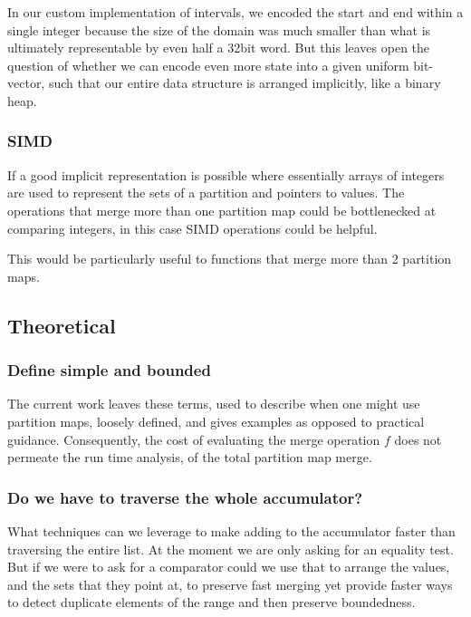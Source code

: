 \documentclass{article}
\begin{document}
In our custom implementation of intervals, we encoded the start and end
within a single integer because the size of the domain was much smaller
than what is ultimately representable by even half a 32bit word.
But this leaves open the question of whether we can encode even more state
into a given uniform bit-vector,
such that our entire data structure is arranged implicitly,
like a binary heap.

\subsubsection{SIMD}

If a good implicit representation is possible where essentially arrays of
integers are used to represent the sets of a partition and pointers to values.
The operations that merge more than one partition map could be bottlenecked
at comparing integers,
in this case SIMD operations could be helpful.

This would be particularly useful to functions that merge more than 2
partition maps.

\subsection{Theoretical}

\subsubsection{Define simple and bounded}

The current work leaves these terms,
used to describe when one might use partition maps,
loosely defined,
and gives examples as opposed to practical guidance.
Consequently,
the cost of evaluating the merge operation $f$ does not permeate
the run time analysis,
of the total partition map merge.

\subsubsection{Do we have to traverse the whole accumulator?}

What techniques can we leverage to make adding to the accumulator
faster than traversing the entire list.
At the moment we are only asking for an equality test.
But if we were to ask for a comparator could we use that to arrange the values,
and the sets that they point at,
to preserve fast merging yet provide faster ways to detect duplicate elements
of the range and then preserve boundedness.
\end{document}
